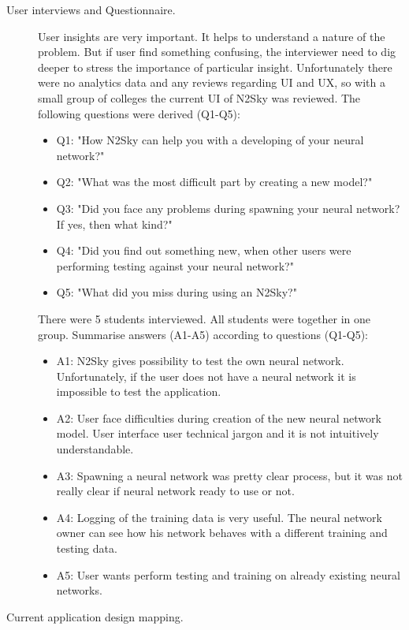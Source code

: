 \begin{description}
\item[User interviews and Questionnaire.]
User insights are very important. It helps to understand a nature of the problem. But if user find something confusing, the interviewer need to dig deeper to stress the importance of particular insight. Unfortunately there were no analytics data and any reviews regarding UI and UX, so with a small group of colleges the current UI of N2Sky was reviewed. 
The following questions were derived (Q1-Q5): 


\begin{itemize}
\item Q1: "How N2Sky can help you with a developing of your neural network?"
\item Q2: "What was the most difficult part by creating a new model?"
\item Q3: "Did you face any problems during spawning your neural network? If yes, then what kind?"
\item Q4: "Did you find out something new, when other users were performing testing against your neural network?"
\item Q5: "What did you miss during using an N2Sky?"
\end{itemize}	

There were 5 students interviewed. All students were together in one group. Summarise answers (A1-A5) according to questions (Q1-Q5): 

\begin{itemize}
\item A1: N2Sky gives possibility to test the own neural network. Unfortunately, if the user does not have a neural network it is impossible to test the application.   
\item A2:  User face difficulties during creation of the new neural network model. User interface user technical jargon and it is not intuitively understandable.  
\item A3:  Spawning a neural network was pretty clear process, but it was not really clear if neural network ready to use or not.
\item A4:  Logging of the training data is very useful. The neural network owner can see how his network behaves with a different training and testing data.
\item A5:  User wants perform testing and training on already existing neural networks. 
\end{itemize}	


\item[Current application design mapping.]


\end{description}
